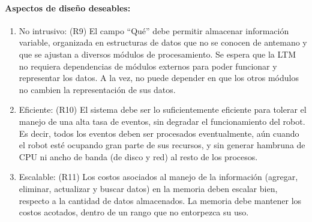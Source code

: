 \paragraph{Aspectos de diseño deseables:}

\begin{enumerate}[topsep=0pt]
	\setlength\itemsep{0.2em}
	\item No intrusivo: (R9) El campo ``Qué'' debe permitir almacenar información variable, organizada en estructuras de datos que no se conocen de antemano y que se ajustan a diversos módulos de procesamiento. Se espera que la LTM no requiera dependencias de módulos externos para poder funcionar y representar los datos. A la vez, no puede depender en que los otros módulos no cambien la representación de sus datos.
	
	\item Eficiente: (R10) El sistema debe ser lo suficientemente eficiente para tolerar el manejo de una alta tasa de eventos, sin degradar el funcionamiento del robot. Es decir, todos los eventos deben ser procesados eventualmente, aún cuando el robot esté ocupando gran parte de sus recursos, y sin generar hambruna de CPU ni ancho de banda (de disco y red) al resto de los procesos.
	
	\item Escalable: (R11) Los costos asociados al manejo de la información (agregar, eliminar, actualizar y buscar datos) en la memoria deben escalar bien, respecto a la cantidad de datos almacenados. La memoria debe mantener los costos acotados, dentro de un rango que no entorpezca su uso.
	
\end{enumerate}


%


